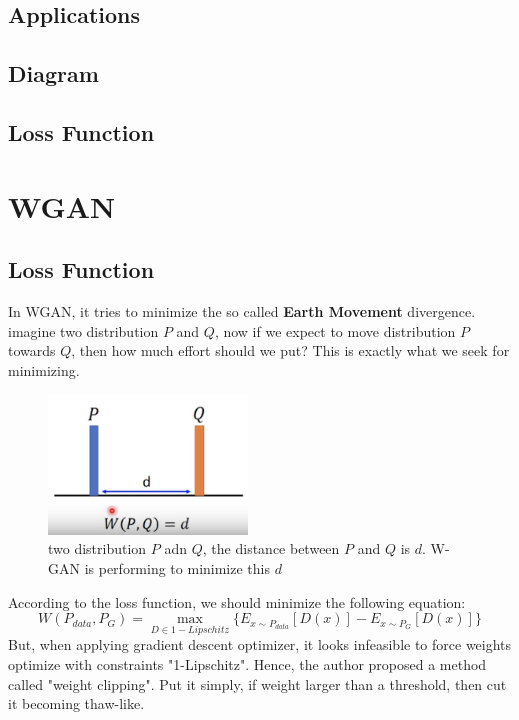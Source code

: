\documentclass{article}
\begin{document}
\subsection{Applications}
\subsection{Diagram}
\subsection{Loss Function}

\section{WGAN}

\subsection{Loss Function}
In WGAN, it tries to minimize the so called \textbf{Earth Movement} divergence. imagine two distribution $P$ and $Q$, now if we expect to move distribution $P$ towards $Q$, then how much effort should we put? This is exactly what we seek for minimizing.
\begin{figure}[H]
    \centering
    \includegraphics[width=200]{W-GAN_loss}
    \caption{two distribution $P$ adn $Q$, the distance between $P$ and $Q$ is $d$. W-GAN is performing to minimize this $d$}
\end{figure}

According to the loss function, we should minimize the following equation:
\begin{equation}
    W(P_{data},P_G)=\max_{D\in 1-Lipschitz}\{E_{x \sim P_{data}}[D(x)]-E_{x \sim P_{G}}[D(x)]\}
\end{equation}
But, when applying gradient descent optimizer, it looks infeasible to force weights optimize with constraints "1-Lipschitz". Hence, the author proposed a method called "weight clipping". Put it simply, if weight larger than a threshold, then cut it becoming thaw-like.
\end{document}
